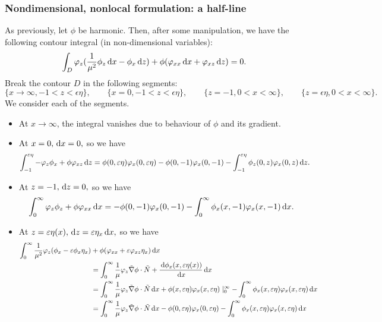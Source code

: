 \documentclass[10pt,reqno,oneside,a4paper]{article}
\begin{document}
\subsubsection{Nondimensional, nonlocal formulation: a half-line}
As previously, let $\phi$ be harmonic. Then, after some manipulation, we have the following contour integral (in non-dimensional variables):
\begin{equation}\label{contourHL1}
\int_D \varphi_z(\frac{1}{\mu^2}\phi_z \,\mathrm{d} x - \phi_x \,\mathrm{d} z) + \phi(\varphi_{xx} \,\mathrm{d} x + \varphi_{xz} \,\mathrm{d} z) = 0.
\end{equation}
Break the contour $D$ in the following segments:
\[ 
\{ x \to \infty, - 1 < z < \epsilon \eta\}, \qquad \{ x = 0, -1 < z < \epsilon\eta\}, \qquad \{ z = -1, 0<x<\infty\}, \qquad \{ z = \epsilon\eta, 0<x<\infty\}.
\]
We consider each of the segments.
\begin{itemize}
\item At $x \to \infty$, the integral vanishes due to behaviour of $\phi$ and its gradient. 
\item At $x = 0, \,\mathrm{d} x = 0,$ so we have 
\begin{align*}
\int_{-1}^{\varepsilon\eta} - \varphi_z \phi_x + \phi \varphi_{xz} \,\mathrm{d} z &= \phi(0, \varepsilon \eta) \varphi_x(0, \varepsilon\eta) - \phi(0, -1) \varphi_x(0, -1) - \int_{-1}^{\varepsilon\eta} \phi_{z}(0,z) \varphi_{x}(0,z) \,\mathrm{d} z. 
\end{align*} 
\item At $z = -1, \,\mathrm{d} z = 0,$ so we have 
\begin{align*}
\int^{\infty}_{0} \varphi_z \phi_z + \phi \varphi_{xx} \,\mathrm{d} x = - \phi(0,-1) \varphi_{x}(0,-1) - \int^{\infty}_{0} \phi_x(x,-1) \varphi_x(x,-1) \,\mathrm{d} x.
\end{align*}
\item At $z =\varepsilon \eta(x), \,\mathrm{d} z = \varepsilon\eta_x \,\mathrm{d} x,$ so we have
\begin{align*}
\int_{0}^{\infty} \frac{1}{\mu^2} \varphi_z(\phi_x - \varepsilon\phi_x \eta_x) &+ \phi(\varphi_{xx}  + \varepsilon \varphi_{xz}\eta_x) \,\mathrm{d} x \\
&=\int_{0}^{\infty} \frac{1}{\mu} \varphi_z \tilde{\nabla} \phi \cdot \tilde{N}+ \frac{\,\mathrm{d} \phi_x(x, \varepsilon \eta(x))}{\,\mathrm{d} x} \,\mathrm{d} x \\
&= \int_{0}^{\infty} \frac{1}{\mu} \varphi_z \tilde{\nabla} \phi\cdot \tilde{N} \,\mathrm{d} x + \phi(x, \varepsilon \eta) \varphi_x(x, \varepsilon\eta) \mid^{\infty}_{0} - \int^{\infty}_{0}\phi_x(x, \varepsilon\eta)  \varphi_x(x, \varepsilon \eta) \,\mathrm{d} x \\
&= \int_{0}^{\infty} \frac{1}{\mu} \varphi_z \tilde{\nabla} \phi \cdot \tilde{N} \,\mathrm{d} x - \phi(0, \varepsilon \eta) \varphi_x(0, \varepsilon\eta) - \int^{\infty}_{0}\phi_x(x, \varepsilon\eta)  \varphi_x(x, \varepsilon \eta) \,\mathrm{d} x 
\end{align*}
 \end{itemize}
\end{document}
